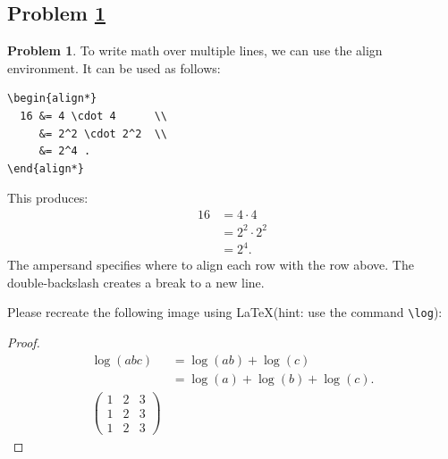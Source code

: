 \documentclass[11pt]{article}
\theoremstyle{definition}
\theoremstyle{definition}
\newtheorem{required}{Problem}
\theoremstyle{definition}
\begin{document}
\newpage
\subsection{Problem \ref{Latex4}}
\begin{required} \label{Latex4}
To write math over multiple lines, we can use the align environment.
It can be used as follows:
\begin{verbatim}
\begin{align*}
  16 &= 4 \cdot 4      \\
     &= 2^2 \cdot 2^2  \\
     &= 2^4 .
\end{align*}
\end{verbatim}
This produces:
\begin{align*}
  16 &= 4 \cdot 4      \\
     &= 2^2 \cdot 2^2  \\
     &= 2^4 .
\end{align*}
The ampersand specifies where to align each row with the row above. The double-backslash creates a break to a new line.

Please recreate the following image using \LaTeX (hint: use the command \texttt{\textbackslash log}):

\begin{center}
\end{center}
\end{required}

\begin{proof}
\begin{align*}
	\log{(abc)} &= \log{(ab)} + \log{(c)}	\\
		       &= \log{(a)} +\log{(b)} + \log{(c)}.\\
\begin{pmatrix}1&2&3\\ 1&2&3\\ 1&2&3\end{pmatrix}
\end{align*} 
\end{proof}



\end{document}
